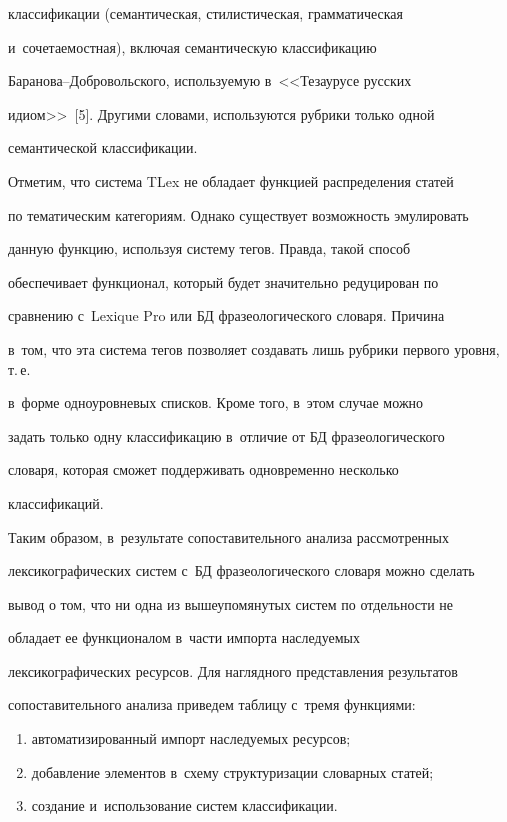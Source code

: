 классификации (семантическая, стилистическая, грамматическая 

и~сочетаемостная), включая семантическую классификацию  

Ба\-ра\-но\-ва--Доб\-ро\-воль\-ско\-го, используемую в~<<Тезаурусе русских 

идиом>>~[5]. Другими словами, используются рубрики только одной 

семантической классификации. 

   

   Отметим, что система TLex не обладает функцией распределения статей 

по тематическим категориям. Однако существует возможность эмулировать 

данную функцию, используя систему тегов. Правда, такой способ 

обеспечивает функционал, который будет значительно редуцирован по 

сравнению с~Lexique Pro или БД фразеологического словаря. Причина  

в~том, что эта сис\-те\-ма тегов позволяет создавать лишь рубрики первого уровня, т.\,е.\

 в~форме одноуровневых списков. Кроме того, в~этом случае можно 

задать только одну классификацию в~отличие от БД фразеологического 

словаря, которая сможет поддерживать одновременно несколько 

классификаций.

   

   Таким образом, в~результате сопоставительного анализа рассмотренных 

лексикографических систем с~БД фразеологического словаря можно сделать 

вывод о том, что ни одна из вышеупомянутых систем по отдельности не 

обладает ее функционалом в~части импорта наследуемых 

лексикографических ресурсов. Для наглядного представления результатов 

сопоставительного анализа приведем таблицу с~тремя функциями:

   \begin{enumerate}[(1)]

\item автоматизированный импорт наследуемых ресурсов;

\item добавление элементов в~схему структуризации словарных статей;

\item создание и~использование систем классификации.

\end{enumerate}



